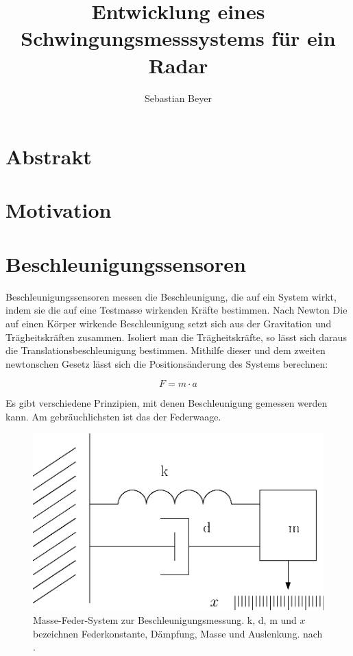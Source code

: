 \documentclass[12pt,a4paper]{scrartcl}
\begin{document}
\title {Entwicklung eines Schwingungsmesssystems für ein Radar}
\author{Sebastian Beyer}
\maketitle
\thispagestyle{empty}
\newpage

\tableofcontents
\thispagestyle{empty}
\newpage




\section{Abstrakt}

\newpage

\section{Motivation}

\newpage

\section{Beschleunigungssensoren}
\onehalfspacing
Beschleunigungssensoren messen die Beschleunigung, die auf ein System wirkt, indem sie die auf eine Testmasse wirkenden Kräfte bestimmen. Nach Newton  Die auf einen Körper wirkende Beschleunigung setzt sich aus der Gravitation und Trägheitskräften zusammen. Isoliert man die Trägheitskräfte, so lässt sich daraus die Translationsbeschleunigung bestimmen. Mithilfe dieser und dem zweiten newtonschen Gesetz lässt sich die Positionsänderung des Systems berechnen: 

\begin{equation}
F = m \cdot a
\end{equation}

Es gibt verschiedene Prinzipien, mit denen Beschleunigung gemessen werden kann. Am gebräuchlichsten ist das der Federwaage.

\begin{figure}[H]
\centering
\includegraphics[scale=0.7]{federmasse.eps}
\caption{Masse-Feder-System zur Beschleunigungsmessung. k, d, m und $x$ bezeichnen Federkonstante, Dämpfung, Masse und Auslenkung. nach \citep{Klingbeil:2006qy}.}
\label{federwaage}
\end{figure}
\end{document}
